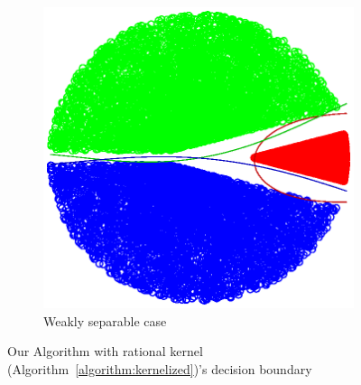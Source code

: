 \begin{figure}[h!]
\begin{subfigure}[b]{0.23\textwidth}
        \hspace*{-0.3cm}  \includegraphics[width=1.15\textwidth, trim={0, 0cm, 0, 0}, clip]{figures/weak_rational_ova_points}
         \caption{Weakly separable case}
    \end{subfigure}
    \vspace*{-0.2cm}
    \caption{Our Algorithm with rational kernel (Algorithm~\ref{algorithm:kernelized})'s decision boundary}
    \label{fig:rationalova-points}
\end{figure}
